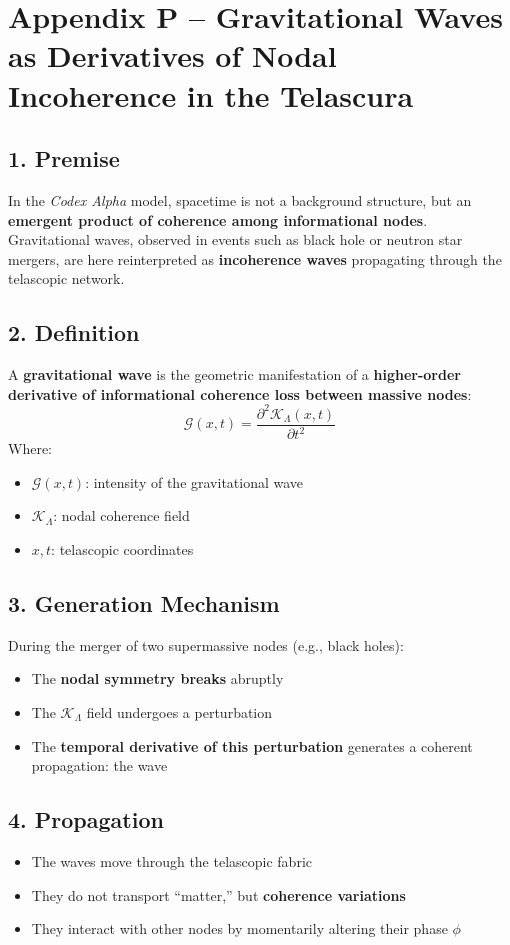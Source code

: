 \documentclass[12pt]{article}
\begin{document}
\section*{Appendix P – Gravitational Waves as Derivatives of Nodal Incoherence in the Telascura}

\subsection*{1. Premise}
In the \textit{Codex Alpha} model, spacetime is not a background structure, but an \textbf{emergent product of coherence among informational nodes}. Gravitational waves, observed in events such as black hole or neutron star mergers, are here reinterpreted as \textbf{incoherence waves} propagating through the telascopic network.

\subsection*{2. Definition}
A \textbf{gravitational wave} is the geometric manifestation of a \textbf{higher-order derivative of informational coherence loss between massive nodes}:
\[
\mathcal{G}(x,t) = \frac{\partial^2 \mathcal{K}_\Lambda(x,t)}{\partial t^2}
\]
Where:
\begin{itemize}
    \item $\mathcal{G}(x,t)$: intensity of the gravitational wave
    \item $\mathcal{K}_\Lambda$: nodal coherence field
    \item $x, t$: telascopic coordinates
\end{itemize}

\subsection*{3. Generation Mechanism}
During the merger of two supermassive nodes (e.g., black holes):
\begin{itemize}
    \item The \textbf{nodal symmetry breaks} abruptly
    \item The $\mathcal{K}_\Lambda$ field undergoes a perturbation
    \item The \textbf{temporal derivative of this perturbation} generates a coherent propagation: the wave
\end{itemize}

\subsection*{4. Propagation}
\begin{itemize}
    \item The waves move through the telascopic fabric
    \item They do not transport “matter,” but \textbf{coherence variations}
    \item They interact with other nodes by momentarily altering their phase $\phi$
\end{itemize}
\end{document}
